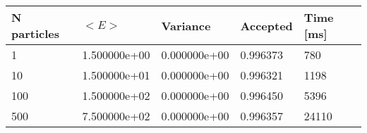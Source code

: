 \begin{table}[h!]
\begin{tabular}{|l|l|l|l|l|}
\hline 
N particles & $<E>$ & Variance & Accepted & Time [ms]\\ 
 \hline 
1 & 1.500000e+00 & 0.000000e+00 & 0.996373 & 780 \\ \hline 
10 & 1.500000e+01 & 0.000000e+00 & 0.996321 & 1198 \\ \hline 
100 & 1.500000e+02 & 0.000000e+00 & 0.996450 & 5396 \\ \hline 
500 & 7.500000e+02 & 0.000000e+00 & 0.996357 & 24110 \\ \hline 
\end{tabular}
\label{i:a3} 
\end{table}
